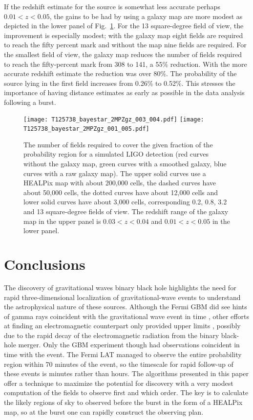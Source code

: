 \documentclass[useAMS,usenatbib]{mn2e}
\begin{document}
If the redshift estimate for the source is somewhat less accurate
perhaps $0.01<z<0.05$, the gains to be had by using a galaxy map are
more modest as depicted in the lower panel of Fig.~\ref{fig:bayestar}.
For the 13 square-degree field of view, the improvement is especially
modest; with the galaxy map eight fields are required to reach the
fifty percent mark and without the map nine fields are required.  For
the smallest field of view, the galaxy map reduces the number of
fields required to reach the fifty-percent mark from 308 to 141, a
55\% reduction.  With the more accurate redshift estimate the
reduction was over 80\%.  The probability of the source lying in the
first field increases from 0.26\% to 0.52\%.  This stresses the
importance of having distance estimates as early as possible in the
data analysis following a burst.
\begin{figure}
  \texttt{[image: T125738\_bayestar\_2MPZgz\_003\_004.pdf]}
  \texttt{[image: T125738\_bayestar\_2MPZgz\_001\_005.pdf]}
  \caption{The number of fields required to cover the given fraction
    of the probability region for a simulated LIGO detection (red
    curves without the galaxy map, green curves with a smoothed
    galaxy, blue curves with a raw galaxy map).  The upper solid
    curves use a HEALPix map with about 200,000 cells, the dashed
    curves have about 50,000 cells, the dotted curves have about
    12,000 cells and lower solid curves have about 3,000 cells,
    corresponding 0.2, 0.8, 3.2 and 13 square-degree fields of
    view. The redshift range of the galaxy map in the upper panel is
    $0.03<z<0.04$ and $0.01<z<0.05$ in the lower panel.}
  \label{fig:bayestar}
\end{figure}

\section{Conclusions}

The discovery of gravitational waves binary black hole highlights the
need for rapid three-dimensional localization of gravitational-wave
events to understand the astrophysical nature of these sources.
Although the Fermi GBM did see hints of gamma rays coincident with the
gravitational wave event in time \citep{2016arXiv160203920C}, other
efforts at finding an electromagnetic counterpart only provided upper limits
\citep[e.g][]{2016arXiv160204198S,2016arXiv160204156S,2016arXiv160204488F},
possibly due to the rapid decay of the electromagnetic radiation from
the binary black-hole merger.  Only the GBM experiment though had
observations coincident in time with the event.  The Fermi LAT managed
to observe the entire probability region within 70 minutes of the
event, so the timescale for rapid follow-up of these events is minutes
rather than hours.  The algorithms presented in this paper offer a
technique to maximize the potential for discovery with a very modest
computation of the fields to observe first and which order.  The key
is to calculate the likely regions of sky to observed before the burst
in the form of a HEALPix map, so at the burst one can rapidly
construct the observing plan.
\end{document}
